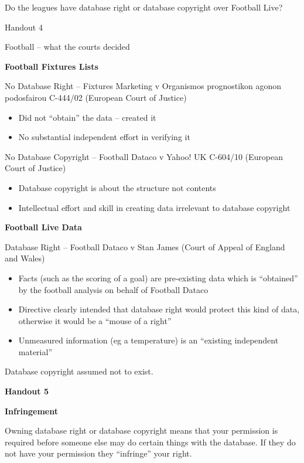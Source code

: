 \documentclass{article}
\begin{document}
Do the leagues have database right or database copyright over Football
Live?

Handout 4

Football -- what the courts decided

\textbf{Football Fixtures Lists}

No Database Right -- Fixtures Marketing v Organismos prognostikon agonon
podosfairou C-444/02 (European Court of Justice)

\begin{itemize}
\item
  Did not ``obtain'' the data -- created it
\item
  No substantial independent effort in verifying it
\end{itemize}

No Database Copyright -- Football Dataco v Yahoo! UK C-604/10 (European
Court of Justice)

\begin{itemize}
\item
  Database copyright is about the structure not contents
\item
  Intellectual effort and skill in creating data irrelevant to database
  copyright
\end{itemize}

\textbf{Football Live Data}

Database Right -- Football Dataco v Stan James (Court of Appeal of
England and Wales)

\begin{itemize}
\item
  Facts (such as the scoring of a goal) are pre-existing data which is
  ``obtained'' by the football analysis on behalf of Football Dataco
\item
  Directive clearly intended that database right would protect this kind
  of data, otherwise it would be a ``mouse of a right''
\item
  Unmeasured information (eg a temperature) is an ``existing independent
  material''
\end{itemize}

Database copyright assumed not to exist.

\textbf{Handout 5}

\textbf{Infringement}

Owning database right or database copyright means that your permission
is required before someone else may do certain things with the database.
If they do not have your permission they ``infringe'' your right.
\end{document}
